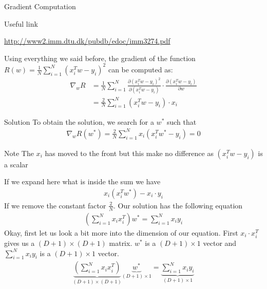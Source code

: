 \begin{parag}{Gradient Computation}
\begin{subparag}{Useful link}
\begin{center}
				\href{http://www2.imm.dtu.dk/pubdb/edoc/imm3274.pdf}{http://www2.imm.dtu.dk/pubdb/edoc/imm3274.pdf}
			\end{center}
		\end{subparag}
		Using everything we said before, the gradient of the function $R\left(w\right) =  \frac{1}{N}\sum_{i= 1}^{N}\left(x_i^Tw-y_i\right)^2$ can be computed as:
		\begin{align*} 
			\nabla_w R &= \frac{1}{N}\sum_{i= 1}^{N} \frac{\partial \left(x_i^Tw - y_i\right)^2}{\partial \left(x_i^Tw - y_i\right)} \cdot \frac{\partial \left(x_i^Tw - y_i\right)}{\partial w} \\
					   &= \frac{2}{N} \sum_{i =  1}^{N}\left(x_i^Tw - y_i\right) \cdot x_i
		\end{align*}

	\end{parag}
	\begin{parag}{Solution}
	    To obtain the solution, we search for a $w^{\ast}$ such that 
		\begin{align*} 
			\nabla_w R\left(w^{\ast}\right) = \frac{2}{N} \sum_{i=  1}^{N} x_i \left(x_i^Tw^{\ast} - y_i\right) = 0
		\end{align*}
		\begin{subparag}{Note}
		    The $x_i$ has moved to the front but this make no difference as $\left(x_i^Tw - y_i\right)$ is a scalar
		\end{subparag}
		If we expand here what is inside the sum we have 
		\begin{align*} x_i(x_i^Tw^{\ast}) - x_i \cdot y_i \end{align*}
		If we remove the constant factor $\frac{2}{N}$. Our solution has the following equation
		\begin{align*} 
			\left(\sum_{i= 1}^{N}x_i x_i^T\right)w^{\ast} =  \sum_{i= 1}^{N}x_i y_i
		\end{align*}
		Okay, first let us look a bit more into the dimension of our equation. First $x_i \cdot x_i^T$ gives us a $\left(D + 1\right) \times \left(D + 1\right)$ matrix. $w^{\ast}$ is a $\left(D + 1\right) \times 1$ vector and $\sum_{i = 1}^{N} x_i y_i$ is a $\left(D + 1\right) \times 1$ vector.
		\begin{align*} 
			\underbrace{\left(\sum_{i= 1}^{N}x_i x_i^T\right)}_{\left(D + 1\right) \times \left(D + 1\right)}\underbrace{w^{\ast}}_{\left(D + 1\right) \times 1} =  \underbrace{\sum_{i= 1}^{N}x_i y_i}_{\left(D + 1\right) \times 1}
		\end{align*}

	\end{parag}
